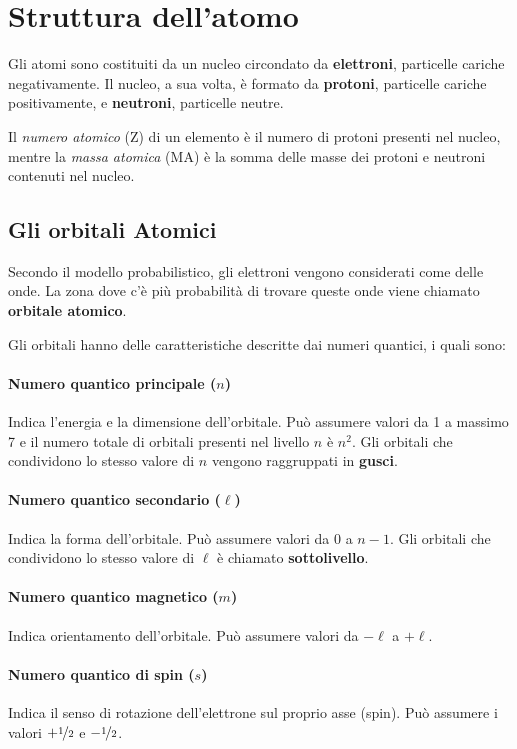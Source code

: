 \section{Struttura dell'atomo}
Gli atomi sono costituiti da un nucleo circondato da \textbf{elettroni}, particelle cariche negativamente. Il nucleo, a sua volta, è formato da \textbf{protoni}, particelle cariche positivamente, e \textbf{neutroni}, particelle neutre.

Il \textit{numero atomico} (Z) di un elemento è il numero di protoni presenti nel nucleo, mentre la \textit{massa atomica} (MA) è la somma delle masse dei protoni e neutroni contenuti nel nucleo.

\subsection{Gli orbitali Atomici}
Secondo il modello probabilistico, gli elettroni vengono considerati come delle onde. La zona dove c'è più probabilità di trovare queste onde viene chiamato \textbf{orbitale atomico}.

Gli orbitali hanno delle caratteristiche descritte dai numeri quantici, i quali sono:
\paragraph{Numero quantico principale (\(n\))} Indica l'energia e la dimensione dell'orbitale. Può assumere valori da 1 a massimo 7 e il numero totale di orbitali presenti nel livello \(n\) è \(n^2\). Gli orbitali che condividono lo stesso valore di \(n\) vengono raggruppati in \textbf{gusci}.
\paragraph{Numero quantico secondario (\(\ell\))} Indica la forma dell'orbitale. Può assumere valori da 0 a \(n-1\). Gli orbitali che condividono lo stesso valore di \(\ell\) è chiamato \textbf{sottolivello}.
\paragraph{Numero quantico magnetico (\(m\))} Indica orientamento dell'orbitale. Può assumere valori da \(-\ell\) a \(+\ell\).
\paragraph{Numero quantico di spin (\(s\))} Indica il senso di rotazione dell'elettrone sul proprio asse (spin). Può assumere i valori \(+\nicefrac{1}{2}\) e \(-\nicefrac{1}{2}\).

